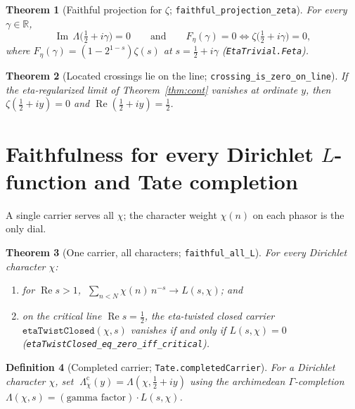\documentclass[11pt]{article}
\newtheorem{definition}{Definition}[section]
\newtheorem{theorem}[definition]{Theorem}
\DeclareMathOperator{\Ree}{Re}
\DeclareMathOperator{\Imm}{Im}
\newcommand{\R}{\mathbb{R}}
\newcommand{\code}[1]{\texttt{#1}}
\begin{document}
\begin{theorem}[Faithful projection for $\zeta$; \code{faithful\_projection\_zeta}]\label{thm:faithproj}
For every $\gamma\in\R$,
\[
  \Imm\,\Lambda\!\bigl(\tfrac12+i\gamma\bigr)=0
  \qquad\text{and}\qquad
  F_\eta(\gamma)=0 \iff \zeta\!\bigl(\tfrac12+i\gamma\bigr)=0,
\]
where $F_\eta(\gamma)=(1-2^{1-s})\zeta(s)$ at $s=\tfrac12+i\gamma$ (\code{EtaTrivial.Feta}).
\end{theorem}

\begin{theorem}[Located crossings lie on the line; \code{crossing\_is\_zero\_on\_line}]\label{thm:located}
If the eta-regularized limit of Theorem~\ref{thm:cont} vanishes at ordinate $y$, then
$\zeta(\tfrac12+iy)=0$ and $\Ree(\tfrac12+iy)=\tfrac12$.
\end{theorem}

\section{Faithfulness for every Dirichlet $L$-function and Tate completion}\label{sec:allL}

A single carrier serves all $\chi$; the character weight $\chi(n)$ on each phasor is the only dial.

\begin{theorem}[One carrier, all characters; \code{faithful\_all\_L}]\label{thm:alll}
For every Dirichlet character $\chi$:
\begin{enumerate}[label=\textup{(\roman*)}]
\item for $\Ree s>1$, $\;\sum_{n<N}\chi(n)\,n^{-s}\to L(s,\chi)$; and
\item on the critical line $\Ree s=\tfrac12$, the eta-twisted closed carrier
$\code{etaTwistClosed}(\chi,s)$ vanishes if and only if $L(s,\chi)=0$
(\code{etaTwistClosed\_eq\_zero\_iff\_critical}).
\end{enumerate}
\end{theorem}

\begin{definition}[Completed carrier; \code{Tate.completedCarrier}]\label{def:completed}
For a Dirichlet character $\chi$, set $\;\Lambda_\chi^{\mathrm{c}}(y)=\Lambda(\chi,\tfrac12+iy)$ using
the archimedean $\Gamma$-completion $\Lambda(\chi,s)=(\text{gamma factor})\cdot L(s,\chi)$.
\end{definition}
\end{document}
